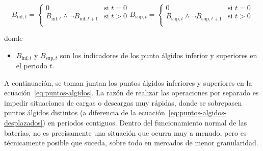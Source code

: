   \begin{samepage}

    \begin{subequations}
      \label{eq:puntos-algidos-desplazados}

      \begin{equation}
        B_{\text{inf}, t} =
        \begin{cases}
          0                                                & \text{si } t = 0 \\
          B_{\text{inf}, t} \land \neg B_{\text{inf}, t+1} & \text{si } t > 0 \\
        \end{cases}
      \end{equation}

      \begin{equation}
        B_{\text{sup}, t} =
        \begin{cases}
          0                                                & \text{si } t = 0 \\
          B_{\text{sup}, t} \land \neg B_{\text{sup}, t+1} & \text{si } t > 0 \\
        \end{cases}
      \end{equation}

    \end{subequations}

    donde

    \begin{itemize}

      \item \( B_{\text{inf}, t} \) y \( B_{\text{sup}, t} \) son los indicadores de los punto álgidos inferior y superiores en el periodo \( t \).

    \end{itemize}

  \end{samepage}

  A continuación, se toman juntan los puntos álgidos inferiores y superiores en la ecuación~\ref{eq:puntos-algidos}. La razón de realizar las operaciones por separado es impedir situaciones de cargas o descargas muy rápidas, donde se sobrepasen puntos álgidos distintos (a diferencia de la ecuación~\ref{eq:puntos-algidos-desplazados}) en periodos contiguos. Dentro del funcionamiento normal de las baterías, no es precisamente una situación que ocurra muy a menudo, pero es técnicamente posible que suceda, sobre todo en mercados de menor granularidad.

